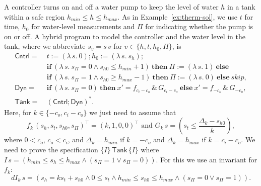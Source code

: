 \documentclass[envcountsame,envcountsect]{llncs}
\newcommand{\IF}[3]{\mathbf{if}\ #1\ \mathbf{then}\ #2\ \mathbf{else}\ #3}
\begin{document}
\begin{example}\label{ex:tank-inv}
A controller turns on and off a water pump to keep the level of water $h$ in a tank within a safe region $h_{min}\leq h\leq h_{max}$. As in Example~\ref{ex:therm-sol}, we use $t$ for time, $h_0$ for water-level measurements and $\Pi$ for indicating whether the pump is on or off. A hybrid program to model the controller and the water level in the tank, where we abbreviate $s_v=s\, v$ for $v\in\{h,t,h_0,\Pi\}$, is
\begin{align*}
	\mathsf{Cntrl} = &\ {t:=(\lambda\, s.\ 0)};{h_0:=(\lambda\, s.\ s_h)};\\
				&\ \IF {(\lambda\, s.\ s_\Pi=0 \land s_{h0}\leq h_{min} + 1)} {\Pi:=(\lambda\, s.\ 1)} {}\\
				&\ \IF {(\lambda\, s.\ s_\Pi=1 \land s_{h0}\geq h_{max} - 1)} {\Pi:=(\lambda\, s.\ 0)} {\mathit{skip}},\\
	\mathsf{Dyn} = &\ \IF {(\lambda\, s.\ s_\Pi=0)} {x' = f_{c_i-c_o}\, \&\, G_{c_i-c_o}} {x' = f_{-c_o}\, \&\, G_{-c_o}},\\
	\mathsf{Tank} = &\ (\mathsf{Cntrl}{;}\mathsf{Dyn})^\ast.
\end{align*}
Here, for $k\in\{-c_o,c_i-c_o\}$ we just need to assume that
\begin{equation*}
	f_k\, (s_h,s_t,s_{h0},s_\Pi)^\top = (k, 1, 0, 0)^\top\text{ and }
	G_k\, s = \left(s_t\leq \frac{\Delta_k-s_{h0}}{k}\right),
\end{equation*}
where $0 < c_o$, $c_o < c_i$, and $\Delta_k=h_{min}$ if $k=-c_o$ and
$\Delta_k = h_{max}$ if $k=c_i-c_o$. We need to prove the
specification $\{I\}\, \mathsf{Tank}\, \{I\}$ where
$I\, s=\left(h_{min}\leq s_h\leq h_{max}\land (s_\Pi = 1 \lor
  s_\Pi=0)\right)$. For this we use an invariant for $f_k$:
\begin{equation*}
dI_k\, s = \left(s_h=ks_t+s_{h0}\land 0\leq s_t\land h_{min}\leq s_{h0}\leq h_{max} \land (s_\Pi=0\lor s_\Pi=1)\right).
\end{equation*}


\end{example}
\end{document}
